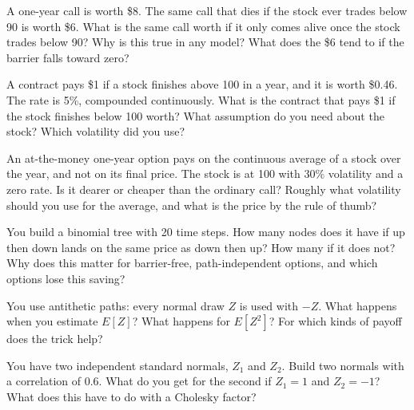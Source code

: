 \begin{question}\label{iq:iv2:pricing-and-numerics:5}
A one-year call is worth \$8. The same call that dies if the stock ever trades below 90 is worth \$6. What is the same call worth if it only comes alive once the stock trades below 90? Why is this true in any model? What does the \$6 tend to if the barrier falls toward zero?
\end{question}

\begin{question}\label{iq:iv2:pricing-and-numerics:6}
A contract pays \$1 if a stock finishes above 100 in a year, and it is worth \$0.46. The rate is 5\%, compounded continuously. What is the contract that pays \$1 if the stock finishes below 100 worth? What assumption do you need about the stock? Which volatility did you use?
\end{question}

\begin{question}\label{iq:iv2:pricing-and-numerics:7}
An at-the-money one-year option pays on the continuous average of a stock over the year, and not on its final price. The stock is at 100 with 30\% volatility and a zero rate. Is it dearer or cheaper than the ordinary call? Roughly what volatility should you use for the average, and what is the price by the rule of thumb?
\end{question}

\begin{question}\label{iq:iv2:pricing-and-numerics:8}
You build a binomial tree with 20 time steps. How many nodes does it have if up then down lands on the same price as down then up? How many if it does not? Why does this matter for barrier-free, path-independent options, and which options lose this saving?
\end{question}

\begin{question}\label{iq:iv2:pricing-and-numerics:9}
You use antithetic paths: every normal draw $Z$ is used with $-Z$. What happens when you estimate $E[Z]$? What happens for $E[Z^2]$? For which kinds of payoff does the trick help?
\end{question}

\begin{question}\label{iq:iv2:pricing-and-numerics:10}
You have two independent standard normals, $Z_1$ and $Z_2$. Build two normals with a correlation of 0.6. What do you get for the second if $Z_1 = 1$ and $Z_2 = -1$? What does this have to do with a Cholesky factor?
\end{question}

